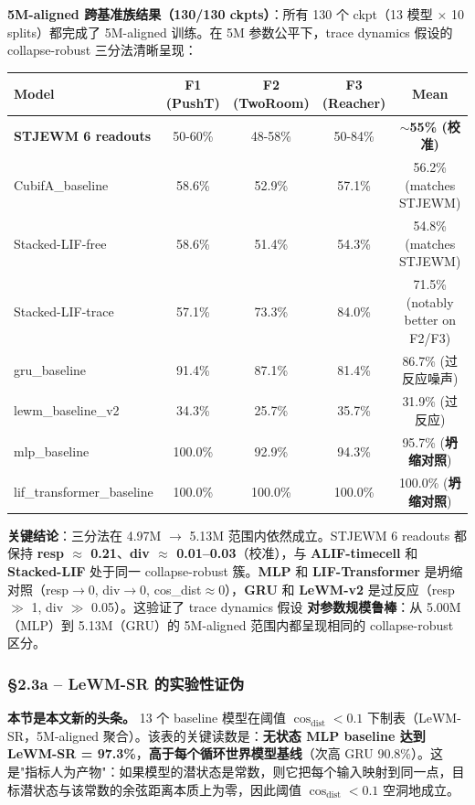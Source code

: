 \documentclass[11pt,a4paper]{article}
\begin{document}
\textbf{5M-aligned 跨基准族结果（130/130 ckpts）}：所有 130 个 ckpt（13 模型 × 10 splits）都完成了 5M-aligned 训练。在 5M 参数公平下，trace dynamics 假设的 collapse-robust 三分法清晰呈现：

\begin{tabular}{lcccc}
\toprule
\textbf{Model} & \textbf{F1 (PushT)} & \textbf{F2 (TwoRoom)} & \textbf{F3 (Reacher)} & \textbf{Mean} \\
\midrule
\textbf{STJEWM 6 readouts} & 50-60\% & 48-58\% & 50-84\% & \textbf{$\sim$55\% (校准)} \\
CubifA\_baseline & 58.6\% & 52.9\% & 57.1\% & 56.2\% (matches STJEWM) \\
Stacked-LIF-free & 58.6\% & 51.4\% & 54.3\% & 54.8\% (matches STJEWM) \\
Stacked-LIF-trace & 57.1\% & 73.3\% & 84.0\% & 71.5\% (notably better on F2/F3) \\
gru\_baseline & 91.4\% & 87.1\% & 81.4\% & 86.7\% (过反应噪声) \\
lewm\_baseline\_v2 & 34.3\% & 25.7\% & 35.7\% & 31.9\% (过反应) \\
mlp\_baseline & 100.0\% & 92.9\% & 94.3\% & 95.7\% (\textbf{坍缩对照}) \\
lif\_transformer\_baseline & 100.0\% & 100.0\% & 100.0\% & 100.0\% (\textbf{坍缩对照}) \\
\bottomrule
\end{tabular}

\textbf{关键结论}：三分法在 4.97M $\to$ 5.13M 范围内依然成立。STJEWM 6 readouts 都保持 \textbf{resp $\approx$ 0.21}、\textbf{div $\approx$ 0.01--0.03}（校准），与 \textbf{ALIF-timecell} 和 \textbf{Stacked-LIF} 处于同一 collapse-robust 簇。\textbf{MLP} 和 \textbf{LIF-Transformer} 是坍缩对照（resp$\to$0, div$\to$0, cos\_dist$\approx$0），\textbf{GRU} 和 \textbf{LeWM-v2} 是过反应（resp $\gg$ 1, div $\gg$ 0.05）。这验证了 trace dynamics 假设 \textbf{对参数规模鲁棒}：从 5.00M（MLP）到 5.13M（GRU）的 5M-aligned 范围内都呈现相同的 collapse-robust 区分。



\subsubsection{§2.3a  --  LeWM-SR 的实验性证伪}

\textbf{本节是本文新的头条。} 13 个 baseline 模型在阈值 $\cos_{\mathrm{dist}} < 0.1$ 下制表（LeWM-SR，5M-aligned 聚合）。该表的关键读数是：\textbf{无状态 MLP baseline 达到 LeWM-SR = 97.3\%}，\textbf{高于每个循环世界模型基线}（次高 GRU 90.8\%）。这是"指标人为产物"：如果模型的潜状态是常数，则它把每个输入映射到同一点，目标潜状态与该常数的余弦距离本质上为零，因此阈值 $\cos_{\mathrm{dist}} < 0.1$ 空洞地成立。
\end{document}
